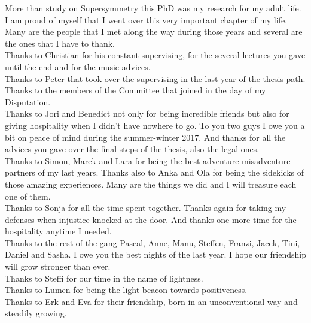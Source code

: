 More than study on Supersymmetry this PhD was my research for my adult life. I am proud of myself that I went over this very important chapter of my life. Many are the people that I met along the way during those years and several are the ones that I have to thank. \\


Thanks to Christian for his constant supervising, for the several lectures you gave until the end and for the music advices.\\

Thanks to Peter that took over the supervising in the last year of the thesis path.\\

Thanks to the members of the Committee that joined in the day of my Disputation.\\

Thanks to Jori and Benedict not only for being incredible friends but also for giving hospitality when I didn't have nowhere to go. To you two guys I owe you a bit on peace of mind during the summer-winter 2017. And thanks for all the advices you gave over the final steps of the thesis, also the legal ones.\\

Thanks to Simon, Marek and Lara for being the best adventure-misadventure partners of my last years. Thanks also to Anka and Ola for being the sidekicks of those amazing experiences. Many are the things we did and I will treasure each one of them.\\

Thanks to Sonja for all the time spent together. Thanks again for taking my defenses when injustice knocked at the door. And thanks one more time for the hospitality anytime I needed.\\

Thanks to the rest of the gang Pascal, Anne, Manu, Steffen, Franzi, Jacek, Tini, Daniel and Sasha. I owe you the best nights of the last year. I hope our friendship will grow stronger than ever.\\

Thanks to Steffi for our time in the name of lightness.\\

Thanks to Lumen for being the light beacon towards positiveness.\\

Thanks to Erk and Eva for their friendship, born in an unconventional way and steadily growing.\\

